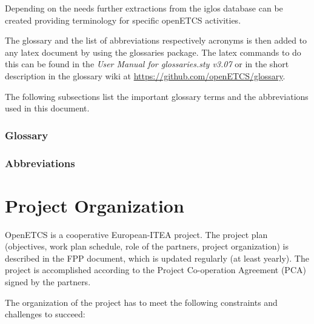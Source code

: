 \documentclass{template/openetcs_article}
\begin{document}
Depending on the needs further extractions from the iglos database can be created providing terminology for specific openETCS activities.

The glossary and the list of abbreviations respectively acronyms is then added to any latex document by using the glossaries package. The latex commands to do this can be found in the \textit{User Manual for glossaries.sty v3.07} or in the short description in the glossary wiki at \url{https://github.com/openETCS/glossary}.

The following subsections list the important glossary terms and the abbreviations used in this document. 

\subsubsection{Glossary}

\printglossary[title=]


\subsubsection{Abbreviations}
\printglossary[type=\acronymtype,title=]


\newpage
\section{Project Organization}

OpenETCS is a cooperative European-ITEA project. The project plan (objectives, work plan schedule, role of the partners, project organization) is described in the \citep{fpp} FPP document, which is updated regularly (at least yearly). The project is accomplished according to the Project Co-operation Agreement (PCA) \citep{PCA} signed by the partners.

The organization of the project has to meet the following constraints and challenges to succeed:
\end{document}
